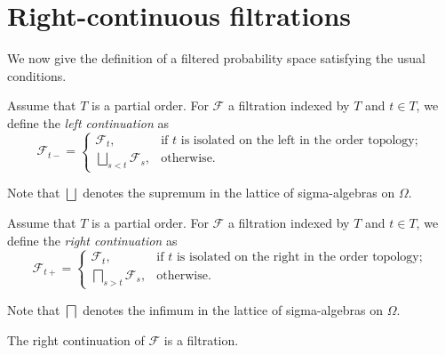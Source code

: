 \section{Right-continuous filtrations}

We now give the definition of a filtered probability space satisfying the usual conditions.


\begin{definition}\label{def:leftLimitFiltration}
Assume that $T$ is a partial order. For $\mathcal{F}$ a filtration indexed by $T$ and $t \in T$, we define the \emph{left continuation} as
$$\mathcal{F}_{t-} =
  \begin{cases}
    \mathcal{F}_t, & \text{if $t$ is isolated on the left in the order topology}; \\
    \bigsqcup_{s < t} \mathcal{F}_s, & \text{otherwise}.
  \end{cases}
$$

Note that $\bigsqcup$ denotes the supremum in the lattice of sigma-algebras on $\Omega$.
\end{definition}


\begin{definition}\label{def:rightLimitFiltration}
  \leanok
Assume that $T$ is a partial order. For $\mathcal{F}$ a filtration indexed by $T$ and $t \in T$, we define the \emph{right continuation} as
$$\mathcal{F}_{t+} =
  \begin{cases}
    \mathcal{F}_t, & \text{if $t$ is isolated on the right in the order topology}; \\
    \bigsqcap_{s > t} \mathcal{F}_s, & \text{otherwise}.
  \end{cases}
$$

Note that $\bigsqcap$ denotes the infimum in the lattice of sigma-algebras on $\Omega$.
\end{definition}


\begin{lemma}\label{lem:filtrationRightCont}
  \leanok
The right continuation of $\mathcal{F}$ is a filtration.
\end{lemma}

